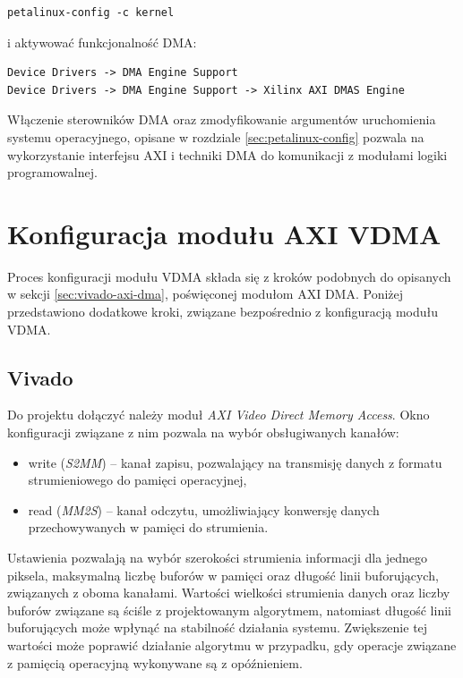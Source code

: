 \begin{lstlisting}[breaklines]
petalinux-config -c kernel
\end{lstlisting}

i aktywować funkcjonalność DMA:

\begin{lstlisting}[breaklines]
Device Drivers -> DMA Engine Support
Device Drivers -> DMA Engine Support -> Xilinx AXI DMAS Engine
\end{lstlisting}

Włączenie sterowników DMA oraz zmodyfikowanie argumentów uruchomienia systemu operacyjnego, opisane w rozdziale \ref{sec:petalinux-config} pozwala na wykorzystanie interfejsu AXI i techniki DMA do komunikacji z modułami logiki programowalnej.

\section{Konfiguracja modułu AXI VDMA}
\label{sec:vivado-axi-vdma}

Proces konfiguracji modułu VDMA składa się z kroków podobnych do opisanych w sekcji \ref{sec:vivado-axi-dma}, poświęconej modułom AXI DMA. Poniżej przedstawiono dodatkowe kroki, związane bezpośrednio z konfiguracją modułu VDMA. %

\subsection{Vivado}
Do projektu dołączyć należy moduł \textit{AXI Video Direct Memory Access}. 
Okno konfiguracji związane z nim pozwala na wybór obsługiwanych kanałów:
\begin{itemize}
	\item write (\emph{S2MM}) -- kanał zapisu, pozwalający na transmisję danych z formatu strumieniowego do pamięci operacyjnej,
	\item read (\emph{MM2S}) -- kanał odczytu, umożliwiający konwersję danych przechowywanych w pamięci do strumienia.
\end{itemize}

Ustawienia pozwalają na wybór szerokości strumienia informacji dla jednego piksela, maksymalną liczbę buforów w pamięci oraz długość linii buforujących, związanych z oboma kanałami.
Wartości wielkości strumienia danych oraz liczby buforów związane są ściśle z projektowanym algorytmem, natomiast długość linii buforujących może wpłynąć na stabilność działania systemu. 
Zwiększenie tej wartości może poprawić działanie algorytmu w przypadku, gdy operacje związane z pamięcią operacyjną wykonywane są z opóźnieniem.

